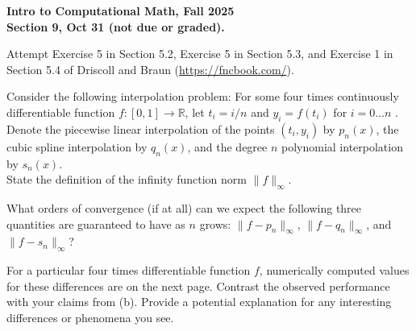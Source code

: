 \documentclass[11pt]{article}
\begin{document}
\begin{center}
{\bf Intro to Computational Math, Fall 2025\\
Section 9, Oct 31 (not due or graded).\\
}
\end{center}


 Attempt Exercise 5 in Section 5.2, Exercise 5 in Section 5.3, and Exercise 1 in Section 5.4 of Driscoll and Braun (\url{https://fncbook.com/}).

\vskip3cm

  Consider the following interpolation problem: For some four times continuously differentiable function $f\colon [0,1]\rightarrow \mathbb{R}$, let $t_i = i/n$ and $y_i = f(t_i)$ for $i=0\dots n$ . Denote the piecewise linear interpolation of the points $(t_i,y_i)$ by $p_n(x)$, the cubic spline interpolation by $q_n(x)$, and the degree $n$ polynomial interpolation by $s_n(x)$.\\

 State the definition of the infinity function norm $\|f\|_\infty$.\\

\vskip 3cm

 What orders of convergence (if at all) can we expect the following three quantities are guaranteed to have as $n$ grows:
$\|f-p_n\|_\infty$, $\|f-q_n\|_\infty$, and $\|f-s_n\|_\infty$?

\vskip 3cm


 For a particular four times differentiable function $f$, numerically computed values for these differences are on the next page.
Contrast the observed performance with your claims from (b). Provide a potential explanation for any interesting differences or phenomena you see.
\end{document}
